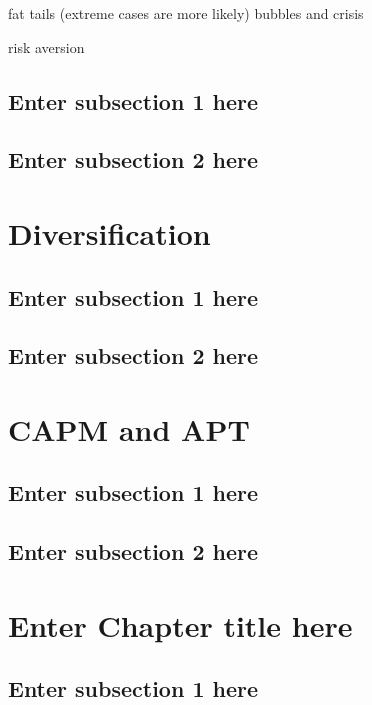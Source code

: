 \documentclass[
]{book}
\begin{document}
fat tails (extreme cases are more likely) bubbles and crisis

risk aversion

\section{Enter subsection 1 here}\label{enter-subsection-1-here}

\section{Enter subsection 2 here}\label{enter-subsection-2-here}

\chapter{Diversification}\label{ch3}

\section{Enter subsection 1 here}\label{enter-subsection-1-here-1}

\section{Enter subsection 2 here}\label{enter-subsection-2-here-1}

\chapter{CAPM and APT}\label{ch4}

\section{Enter subsection 1 here}\label{enter-subsection-1-here-2}

\section{Enter subsection 2 here}\label{enter-subsection-2-here-2}

\chapter{Enter Chapter title here}\label{ch5}

\section{Enter subsection 1 here}\label{enter-subsection-1-here-3}
\end{document}
